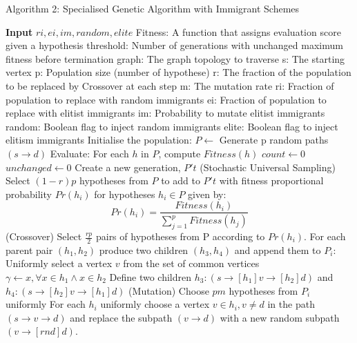 \documentclass[
	a4paper, %
	10pt, %
	unnumberedsections, %
	twoside, %
]{LTJournalArticle}
\begin{document}
\begin{algorithm}[H]
	\caption{Algorithm 2: Specialised Genetic Algorithm with Immigrant Schemes}
	\begin{algorithmic}[1]
			\State \textbf{Input} $ri, ei, im, random, elite$ 
			\State Fitness: A function that assigns evaluation score given a hypothesis 
			\State threshold: Number of generations with unchanged maximum fitness before termination
			\State graph: The graph topology to traverse
			\State s: The starting vertex 
			\State p: Population size (number of hypothese)
			\State r: The fraction of the population to be replaced by Crossover at each step
			\State m: The mutation rate 
			\State ri: Fraction of population to replace with random immigrants
			\State ei: Fraction of population to replace with elitist immigrants
			\State im: Probability to mutate elitist immigrants 
			\State random: Boolean flag to inject random immigrants 
			\State elite: Boolean flag to inject elitism immigrants 
			\State Initialise the population: 
				\State \(P \leftarrow\) Generate p random paths \((s \rightarrow d)\) 
			\State Evaluate: For each $h$ in $P$, compute $Fitness(h)$
			\State $count \leftarrow 0$ 
			\State $unchanged \leftarrow 0$ 
				\State Create a new generation, $P't$
				\State (Stochastic Universal Sampling) Select $(1 - r)p$ hypotheses from $P$ to add to $P't$ with fitness proportional probability $Pr(h_{i})$ for hypotheses $h_{i} \in P$ given by: 
					\State \[ Pr(h_{i}) = \frac{Fitness(h_{i})}{\sum_{j=1}^{p} Fitness(h_{j})} \]
				\State (Crossover) Select $\frac{rp}{2}$ pairs of hypotheses from P according to $Pr(h_{i})$. 
						\State For each parent pair $(h_{1}, h_{2})$ produce two children $(h_{3}, h_{4})$ and append them to $P_{i}$:
							\State Uniformly select a vertex \(v\) from the set of common vertices\(\gamma \leftarrow x, \forall x \in h_{1} \land x \in h_{2}\) 
							\State Define two children $h_{3}: (s \rightarrow[h_{1}] v \rightarrow[h_{2}] d)$ and $h_{4}: (s \rightarrow[h_{2}] v \rightarrow[h_{1}] d)$ 
					\State (Mutation) Choose $pm$ hypotheses from $P_{i}$ uniformly
						\State For each $h_{i}$ uniformly choose a vertex \(v \in h_{i}, v \neq d\) in the path \((s \rightarrow v \rightarrow d)\) and replace the subpath \((v \rightarrow d)\) with a new random subpath \((v \rightarrow[rnd] d)\).	
		\EndWhile  
	\EndProcedure
	\end{algorithmic}
	\label{alg:higa} 
\end{algorithm}
\end{document}
